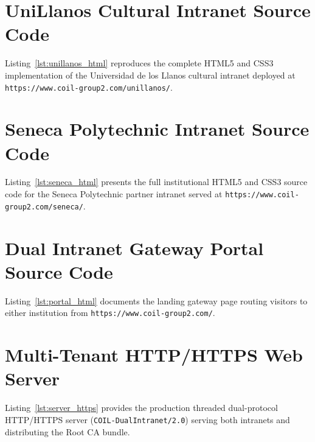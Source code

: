 \section{UniLlanos Cultural Intranet Source Code}
\label{app:unillanos_html}
Listing~\ref{lst:unillanos_html} reproduces the complete HTML5 and CSS3 implementation of the Universidad de los Llanos cultural intranet deployed at \texttt{https://www.coil-group2.com/unillanos/}.



\section{Seneca Polytechnic Intranet Source Code}
\label{app:seneca_html}
Listing~\ref{lst:seneca_html} presents the full institutional HTML5 and CSS3 source code for the Seneca Polytechnic partner intranet served at \texttt{https://www.coil-group2.com/seneca/}.



\section{Dual Intranet Gateway Portal Source Code}
\label{app:portal_html}
Listing~\ref{lst:portal_html} documents the landing gateway page routing visitors to either institution from \texttt{https://www.coil-group2.com/}.



\section{Multi-Tenant HTTP/HTTPS Web Server}
\label{app:server_https}
Listing~\ref{lst:server_https} provides the production threaded dual-protocol HTTP/HTTPS server (\texttt{COIL-DualIntranet/2.0}) serving both intranets and distributing the Root CA bundle.



